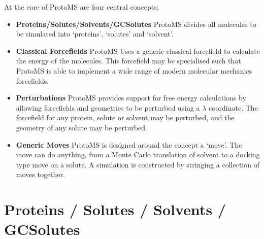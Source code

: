 \documentclass[letterpaper,10pt,english]{manual}
\begin{document}
At the core of ProtoMS are four central concepts;
\begin{itemize}
\item {} 
\textbf{Proteins/Solutes/Solvents/GCSolutes} ProtoMS divides all molecules to be simulated into ‘proteins’, ‘solutes’ and ‘solvent’.

\item {} 
\textbf{Classical Forcefields} ProtoMS Uses a generic classical forcefield to calculate the energy of the molecules. This forcefield may be specialised such that ProtoMS is able to implement a wide range of modern molecular mechanics forcefields.

\item {} 
\textbf{Perturbations} ProtoMS provides support for free energy calculations by allowing forcefields and geometries to be perturbed using a $\lambda$ coordinate. The forcefield for any protein, solute or solvent may be perturbed, and the geometry of any solute may be perturbed.

\item {} 
\textbf{Generic Moves} ProtoMS is designed around the concept a ‘move’. The move can do anything, from a Monte Carlo translation of solvent to a docking type move on a solute. A simulation is constructed by stringing a collection of moves together.

\end{itemize}


\section{Proteins / Solutes / Solvents / GCSolutes}
\end{document}
